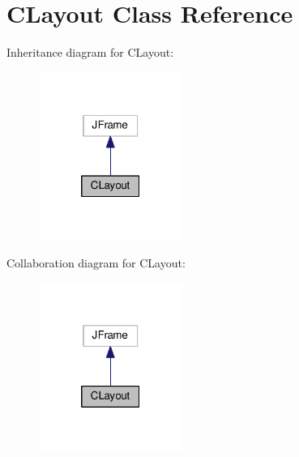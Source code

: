 \hypertarget{class_c_layout}{}\section{C\+Layout Class Reference}
\label{class_c_layout}


Inheritance diagram for C\+Layout\+:
\nopagebreak
\begin{figure}[H]
\begin{center}
\leavevmode
\includegraphics[width=133pt]{class_c_layout__inherit__graph}
\end{center}
\end{figure}


Collaboration diagram for C\+Layout\+:
\nopagebreak
\begin{figure}[H]
\begin{center}
\leavevmode
\includegraphics[width=133pt]{class_c_layout__coll__graph}
\end{center}
\end{figure}
